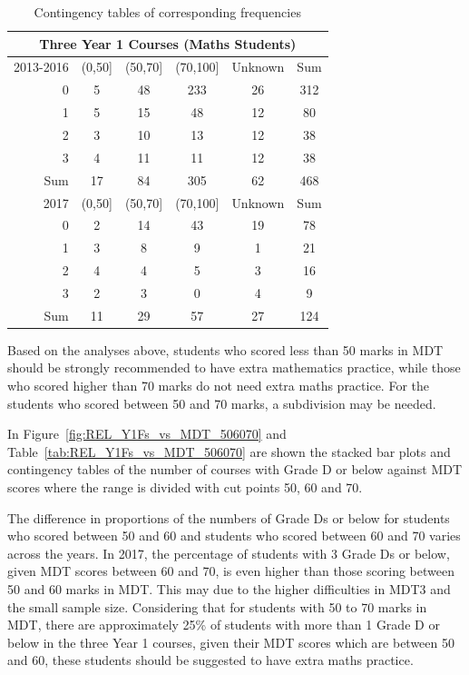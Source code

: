 \documentclass[a4paper]{report}
\begin{document}
\begin{table}[ht]
  \centering
  \begin{tabular}{r|cccc|c}
    \hline
    \multicolumn{6}{c}{\textbf{Three Year 1 Courses (Maths Students)}} \\
    \hline
  2013-2016 & (0,50] & (50,70] & (70,100] & Unknown & Sum \\ 
    \hline
  0 & 5 & 48 & 233 & 26 & 312 \\ 
    1 & 5 & 15 & 48 & 12 & 80 \\ 
    2 & 3 & 10 & 13 & 12 & 38 \\ 
    3 & 4 & 11 & 11 & 12 & 38 \\
    \hline
    Sum & 17 & 84 & 305 & 62 & 468 \\ 
    \hline
     \hline
    2017 & (0,50] & (50,70] & (70,100] & Unknown & Sum \\ 
    \hline
    0 & 2 & 14 & 43 & 19 & 78 \\ 
      1 & 3 & 8 & 9 & 1 & 21 \\ 
      2 & 4 & 4 & 5 & 3 & 16 \\ 
      3 & 2 & 3 & 0 & 4 & 9 \\ 
    \hline
      Sum & 11 & 29 & 57 & 27 & 124 \\ 
       \hline
  \end{tabular}
  \caption{\label{tab:REL_Y1Fs_vs_MDT_maths}Contingency tables of corresponding frequencies}
\end{table}

Based on the analyses above, students who scored less than 50 marks in MDT should be strongly recommended to have extra mathematics practice, while those who scored higher than 70 marks do not need extra maths practice. For the students who scored between 50 and 70 marks, a subdivision may be needed. 

In Figure~\ref{fig:REL_Y1Fs_vs_MDT_506070} and Table~\ref{tab:REL_Y1Fs_vs_MDT_506070} are shown the stacked bar plots and contingency tables of the number of courses with Grade D or below against MDT scores where the range is divided with cut points 50, 60 and 70. 

The difference in proportions of the numbers of Grade Ds or below for students who scored between 50 and 60 and students who scored between 60 and 70 varies across the years. In 2017, the percentage of students with 3 Grade Ds or below, given MDT scores between 60 and 70, is even higher than those scoring between 50 and 60 marks in MDT. This may due to the higher difficulties in MDT3 and the small sample size. Considering that for students with 50 to 70 marks in MDT, there are approximately 25\% of students with more than 1 Grade D or below in the three Year 1 courses, given their MDT scores which are between 50 and 60, these students should be suggested to have extra maths practice. 
\end{document}
